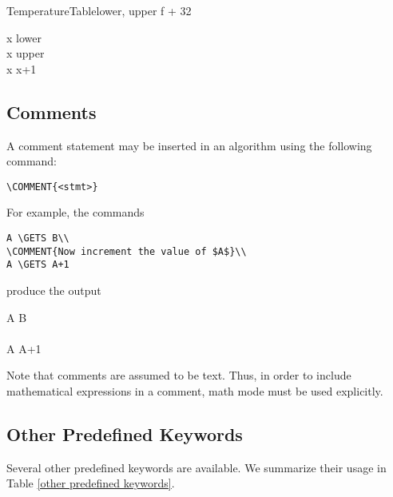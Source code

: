 \documentclass{article}
\begin{document}
\begin{pseudocode}{TemperatureTable}{lower, upper}
  f  + 32\\
\ENDPROCEDURE 

\MAIN
x \GETS lower \\
\WHILE x \leq upper \DO
\BEGIN
 \\
 x \GETS x+1
\END
\ENDMAIN
\end{pseudocode}


\subsection{Comments}

A comment statement may be inserted in an algorithm using the
following command:
\begin{verbatim}
\COMMENT{<stmt>}
\end{verbatim}
For example, the commands
\begin{verbatim}
A \GETS B\\
\COMMENT{Now increment the value of $A$}\\
A \GETS A+1
\end{verbatim}

\noindent{}produce the output

\medskip
\begin{pseudocode}[display]{}{}
A \GETS B\\
\\
A \GETS A+1
\end{pseudocode}

\medskip

Note that comments are assumed to be text. Thus, in order to include
mathematical expressions in a comment, math mode must be used explicitly.

\subsection{Other Predefined Keywords}

Several other predefined keywords are available.
We summarize their usage in Table \ref{other predefined keywords}.
\end{document}
